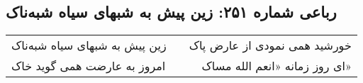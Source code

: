 \begin{center}
\section*{رباعی شماره ۲۵۱: زین پیش به شبهای سیاه شبه‌ناک}
\label{sec:sh251}
\begin{longtable}{l p{0.5cm} r}
زین پیش به شبهای سیاه شبه‌ناک
&&
خورشید همی نمودی از عارض پاک
\\
امروز به عارضت همی گوید خاک
&&
ای روز زمانه «انعم الله مساک»
\\
\end{longtable}
\end{center}
